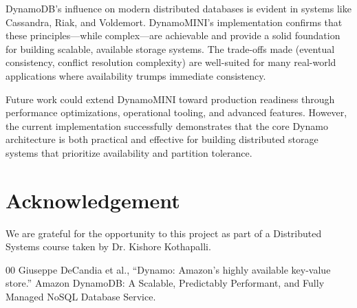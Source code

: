 \documentclass[conference]{IEEEtran}
\begin{document}
DynamoDB's influence on modern distributed databases is evident in systems like Cassandra, Riak, and Voldemort. DynamoMINI's implementation confirms that these principles—while complex—are achievable and provide a solid foundation for building scalable, available storage systems. The trade-offs made (eventual consistency, conflict resolution complexity) are well-suited for many real-world applications where availability trumps immediate consistency.

Future work could extend DynamoMINI toward production readiness through performance optimizations, operational tooling, and advanced features. However, the current implementation successfully demonstrates that the core Dynamo architecture is both practical and effective for building distributed storage systems that prioritize availability and partition tolerance.

\section{Acknowledgement}
We are grateful for the opportunity to this project as part of a Distributed Systems course taken by Dr. Kishore Kothapalli. %

\begin{thebibliography}{00}
 Giuseppe DeCandia et al., ``Dynamo: Amazon's highly available key-value store.''
 Amazon DynamoDB: A Scalable, Predictably Performant, and Fully Managed NoSQL Database Service.
\end{thebibliography}
\end{document}
